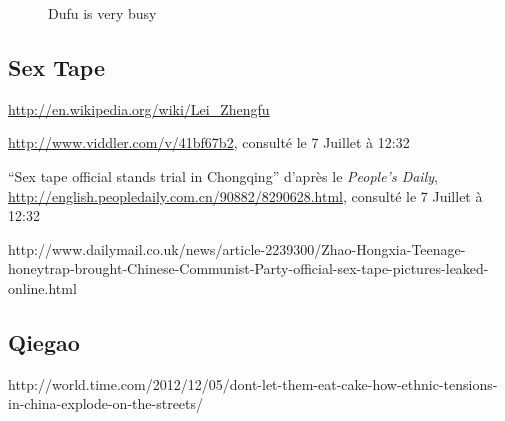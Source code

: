 \begin{figure}[h!]
    \caption{
      Dufu is very busy 
    }
\end{figure}

\subsection{Sex Tape }

\url{http://en.wikipedia.org/wiki/Lei_Zhengfu}

\url{http://www.viddler.com/v/41bf67b2}, consulté le 7 Juillet à 12:32

``Sex tape official stands trial in Chongqing'' d'après le \textit{People's Daily}, \url{http://english.peopledaily.com.cn/90882/8290628.html}, consulté le 7 Juillet à 12:32

http://www.dailymail.co.uk/news/article-2239300/Zhao-Hongxia-Teenage-honeytrap-brought-Chinese-Communist-Party-official-sex-tape-pictures-leaked-online.html


\subsection{Qiegao}

http://world.time.com/2012/12/05/dont-let-them-eat-cake-how-ethnic-tensions-in-china-explode-on-the-streets/